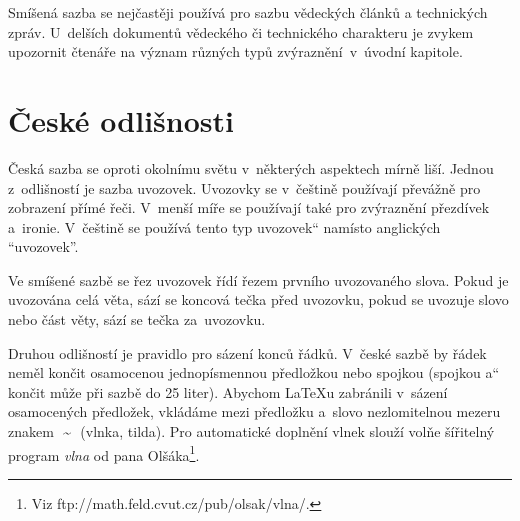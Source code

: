 \documentclass[a4paper,11pt,twocolumn]{article}[7.3.2016]
\providecommand{\uv}[1]{\quotedblbase #1\textquotedblleft}
\begin{document}
Smíšená sazba se nejčastěji používá pro sazbu vědeckých článků a technických zpráv. U~delších dokumentů vědeckého či technického charakteru je zvykem upozornit čtenáře na význam různých typů zvý\-raz\-ně\-ní~v~úvodní kapitole.
	
\section{České odlišnosti}
Česká sazba se oproti okolnímu světu v~některých aspektech mírně liší. Jednou z~odlišností je sazba uvozovek. Uvozovky se v~češtině používají převážně pro zobrazení přímé řeči. V~menší míře se používají také pro zvýraznění přezdívek a~ironie. V~češtině se použí\-vá tento \uv{typ uvozovek} namísto anglických ``uvozovek''.
	
Ve smíšené sazbě se řez uvozovek řídí řezem prv\-ní\-ho uvozovaného slova. Pokud je uvozována celá věta, sází se koncová tečka před uvozovku, pokud se uvozuje slovo nebo část věty, sází se tečka za~uvozovku.
	
Druhou odlišností je pravidlo pro sázení konců řádků. V~české sazbě by řádek neměl končit osamoce\-nou jednopísmennou předložkou nebo spojkou (spoj\-kou \uv{a} končit může při sazbě do 25 liter). Abychom \LaTeX u zabránili v~sázení osa\-mo\-ce\-ných předložek, vkládáme mezi předložku a~slovo nezlomitelnou mezeru znakem\ \,\~{}\ \,(vlnka, tilda). Pro automatické do\-plnění vlnek slouží volňe šířitelný program \textit{vlna} od pana Olšáka\footnote{Viz ftp://math.feld.cvut.cz/pub/olsak/vlna/.}.
	
\end{document}
